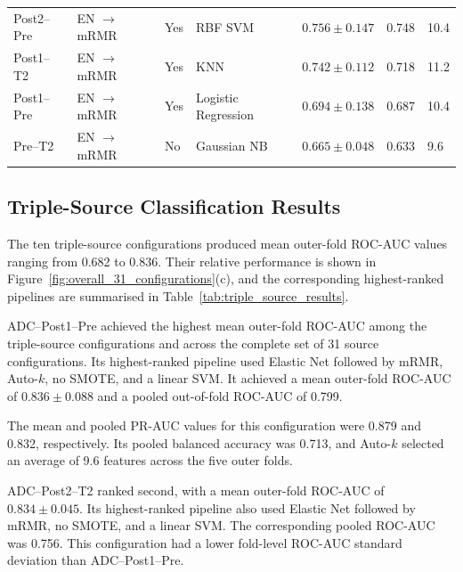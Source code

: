 \documentclass[12pt,twocolumn]{article}
\begin{document}
\begin{table}[htbp]
\begin{tabularx}{\textwidth}{
    p{1.9cm}
    p{2.6cm}
    p{1.1cm}
    p{2.3cm}
    p{2.4cm}
    p{1.8cm}
    X
}
Post2--Pre &
EN \(\rightarrow\) mRMR &
Yes &
RBF SVM &
\(0.756 \pm 0.147\) &
0.748 &
10.4 \\

Post1--T2 &
EN \(\rightarrow\) mRMR &
Yes &
KNN &
\(0.742 \pm 0.112\) &
0.718 &
11.2 \\

Post1--Pre &
EN \(\rightarrow\) mRMR &
Yes &
Logistic Regression &
\(0.694 \pm 0.138\) &
0.687 &
10.4 \\

Pre--T2 &
EN \(\rightarrow\) mRMR &
No &
Gaussian NB &
\(0.665 \pm 0.048\) &
0.633 &
9.6 \\

\bottomrule
\end{tabularx}
\end{table}








\subsection{Triple-Source Classification Results}
\label{subsec:triple_source_results}

The ten triple-source configurations produced mean outer-fold
ROC-AUC values ranging from 0.682 to 0.836. Their relative
performance is shown in
Figure~\ref{fig:overall_31_configurations}(c), and the corresponding
highest-ranked pipelines are summarised in
Table~\ref{tab:triple_source_results}.

ADC--Post1--Pre achieved the highest mean outer-fold ROC-AUC among
the triple-source configurations and across the complete set of 31
source configurations. Its highest-ranked pipeline used Elastic Net
followed by mRMR, Auto-\(k\), no SMOTE, and a linear SVM. It achieved
a mean outer-fold ROC-AUC of \(0.836 \pm 0.088\) and a pooled
out-of-fold ROC-AUC of 0.799.

The mean and pooled PR-AUC values for this configuration were 0.879
and 0.832, respectively. Its pooled balanced accuracy was 0.713,
and Auto-\(k\) selected an average of 9.6 features across the five
outer folds.

ADC--Post2--T2 ranked second, with a mean outer-fold ROC-AUC of
\(0.834 \pm 0.045\). Its highest-ranked pipeline also used Elastic
Net followed by mRMR, no SMOTE, and a linear SVM. The corresponding
pooled ROC-AUC was 0.756. This configuration had a lower fold-level
ROC-AUC standard deviation than ADC--Post1--Pre.
\end{document}
